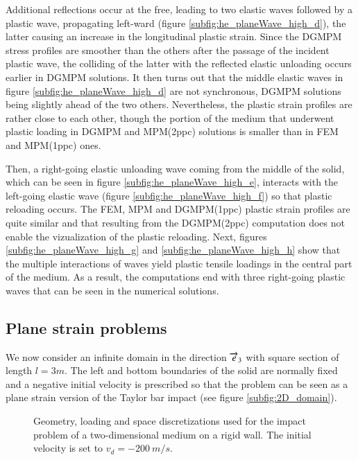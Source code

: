 Additional reflections occur at the free, leading to two elastic waves followed by a plastic wave, propagating left-ward (figure \ref{subfig:he_planeWave_high_d}), the latter causing an increase in the longitudinal plastic strain.
Since the DGMPM stress profiles are smoother than the others after the passage of the incident plastic wave, the colliding of the latter with the reflected elastic unloading occurs earlier in DGMPM solutions.
It then turns out that the middle elastic waves in figure \ref{subfig:he_planeWave_high_d} are not synchronous, DGMPM solutions being slightly ahead of the two others.
Nevertheless, the plastic strain profiles are rather close to each other, though the portion of the medium that underwent plastic loading in DGMPM and MPM(2ppc) solutions is smaller than in FEM and MPM(1ppc) ones.

Then, a right-going elastic unloading wave coming from the middle of the solid, which can be seen in figure \ref{subfig:he_planeWave_high_e}, interacts with the left-going elastic wave (figure \ref{subfig:he_planeWave_high_f}) so that plastic reloading occurs.
The FEM, MPM and DGMPM(1ppc) plastic strain profiles are quite similar and that resulting from the DGMPM(2ppc) computation does not enable the vizualization of the plastic reloading.
Next, figures \ref{subfig:he_planeWave_high_g} and \ref{subfig:he_planeWave_high_h} show that the multiple interactions of waves yield plastic tensile loadings in the central part of the medium.
As a result, the computations end with three right-going plastic waves that can be seen in the numerical solutions.


\subsection{Plane strain problems}
\label{sec:plane-strain-problem}
We now consider an infinite domain in the direction ${\overrightarrow{e}}_3$ with square section of length $l=3m$.
The left and bottom boundaries of the solid are normally fixed and a negative initial velocity is prescribed so that the problem can be seen as a plane strain version of the Taylor bar impact (see figure \ref{subfig:2D_domain}).
\begin{figure}[h!]
  \centering
   \qquad
  \caption{Geometry, loading and space discretizations used for the impact problem of a two-dimensional medium on a rigid wall. The initial velocity is set to $v_d=-200 \: m/s$.}
  \label{fig:PS_domain}
\end{figure}

